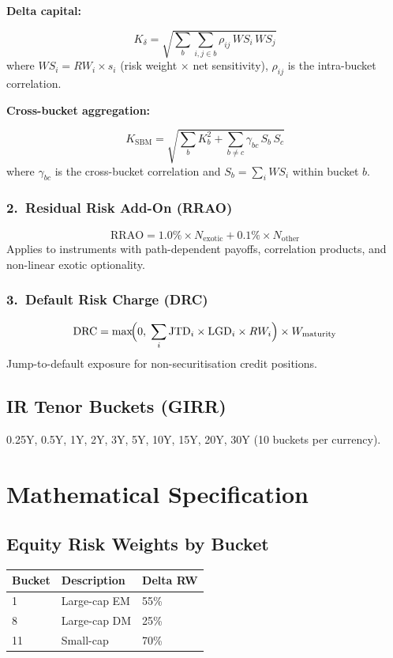 \documentclass{apex_mdd}
\begin{document}
\textbf{Delta capital:}
\begin{formulabox}
\[
  K_{\delta} = \sqrt{\sum_b \sum_{i,j\in b} \rho_{ij}\,WS_i\,WS_j}
\]
where $WS_i = RW_i \times s_i$ (risk weight $\times$ net sensitivity), $\rho_{ij}$ is the intra-bucket correlation.
\end{formulabox}

\textbf{Cross-bucket aggregation:}
\begin{formulabox}
\[
  K_{\mathrm{SBM}} = \sqrt{\sum_b K_b^2 + \sum_{b \neq c} \gamma_{bc}\,S_b\,S_c}
\]
where $\gamma_{bc}$ is the cross-bucket correlation and $S_b = \sum_i WS_i$ within bucket $b$.
\end{formulabox}

\subsubsection{2.\ Residual Risk Add-On (RRAO)}
\begin{formulabox}
\[
  \mathrm{RRAO} = 1.0\% \times N_{\mathrm{exotic}} + 0.1\% \times N_{\mathrm{other}}
\]
Applies to instruments with path-dependent payoffs, correlation products, and non-linear exotic optionality.
\end{formulabox}

\subsubsection{3.\ Default Risk Charge (DRC)}
\begin{formulabox}
\[
  \mathrm{DRC} = \max\!\Bigl(0,\;\sum_i \mathrm{JTD}_i \times \mathrm{LGD}_i \times RW_i\Bigr) \times W_{\mathrm{maturity}}
\]
Jump-to-default exposure for non-securitisation credit positions.
\end{formulabox}

\subsection{IR Tenor Buckets (GIRR)}
0.25Y, 0.5Y, 1Y, 2Y, 3Y, 5Y, 10Y, 15Y, 20Y, 30Y (10 buckets per currency).

\section{Mathematical Specification}

\subsection{Equity Risk Weights by Bucket}
\begin{center}
\small
\begin{tabular}{lll}
\toprule
\textbf{Bucket} & \textbf{Description} & \textbf{Delta RW} \\
\midrule
1  & Large-cap EM & 55\% \\
8  & Large-cap DM & 25\% \\
11 & Small-cap    & 70\% \\
\bottomrule
\end{tabular}
\end{center}
\end{document}
